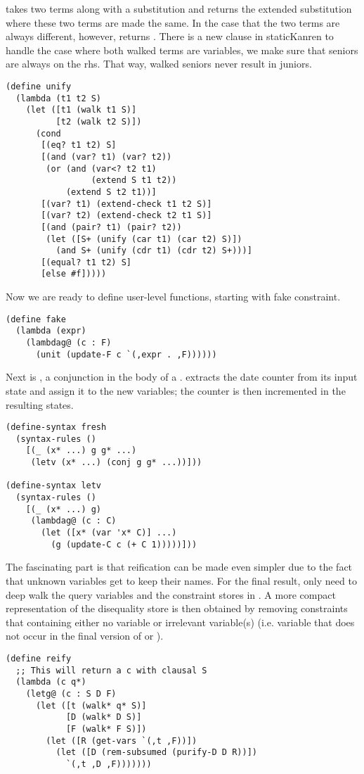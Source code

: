  takes two terms along with a substitution and returns the extended substitution where these two terms are made the same. In the case that the two terms are always different, however,  returns . There is a new clause in staticKanren to handle the case where both walked terms are variables, we make sure that seniors are always on the rhs. That way, walked seniors never result in juniors.
\begin{lstlisting}
(define unify
  (lambda (t1 t2 S)
    (let ([t1 (walk t1 S)]
          [t2 (walk t2 S)])
      (cond
       [(eq? t1 t2) S]
       [(and (var? t1) (var? t2))
        (or (and (var<? t2 t1)
                 (extend S t1 t2))
            (extend S t2 t1))]
       [(var? t1) (extend-check t1 t2 S)]
       [(var? t2) (extend-check t2 t1 S)]
       [(and (pair? t1) (pair? t2))
        (let ([S+ (unify (car t1) (car t2) S)])
          (and S+ (unify (cdr t1) (cdr t2) S+)))]
       [(equal? t1 t2) S]
       [else #f]))))
\end{lstlisting}

Now we are ready to define user-level functions, starting with fake constraint.
\begin{lstlisting}
(define fake
  (lambda (expr)
    (lambdag@ (c : F)
      (unit (update-F c `(,expr . ,F))))))
\end{lstlisting}

Next is , a conjunction in the body of a .  extracts the date counter from its input state and assign it to the new variables; the counter is then incremented in the resulting states.
\begin{lstlisting}
(define-syntax fresh
  (syntax-rules ()
    [(_ (x* ...) g g* ...)
     (letv (x* ...) (conj g g* ...))]))

(define-syntax letv
  (syntax-rules ()
    [(_ (x* ...) g)
     (lambdag@ (c : C)
       (let ([x* (var 'x* C)] ...)
         (g (update-C c (+ C 1)))))]))
\end{lstlisting}

The fascinating part is that reification can be made even simpler due to the fact that unknown variables get to keep their names. For the final result,  only need to deep walk the query variables and the constraint stores in . A more compact representation of the disequality store is then obtained by removing constraints that containing either no variable or irrelevant variable(s) (i.e. variable that does not occur in the final version of  or ).
\begin{lstlisting}
(define reify
  ;; This will return a c with clausal S
  (lambda (c q*)
    (letg@ (c : S D F)
      (let ([t (walk* q* S)]
            [D (walk* D S)]
            [F (walk* F S)])
        (let ([R (get-vars `(,t ,F))])
          (let ([D (rem-subsumed (purify-D D R))])
            `(,t ,D ,F)))))))
\end{lstlisting}

